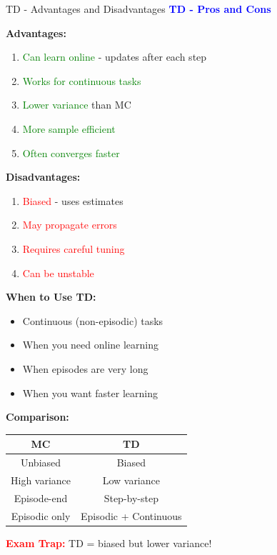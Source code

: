 \documentclass[8pt]{beamer}
\begin{document}
\begin{frame}{TD - Advantages and Disadvantages}
\fontsize{6.5}{7.5}\selectfont
\textcolor{blue}{\textbf{TD - Pros and Cons}}

\textbf{Advantages:}
\begin{enumerate}
\item \textcolor{green}{Can learn online} - updates after each step
\item \textcolor{green}{Works for continuous tasks}
\item \textcolor{green}{Lower variance} than MC
\item \textcolor{green}{More sample efficient}
\item \textcolor{green}{Often converges faster}
\end{enumerate}

\textbf{Disadvantages:}
\begin{enumerate}
\item \textcolor{red}{Biased} - uses estimates
\item \textcolor{red}{May propagate errors}
\item \textcolor{red}{Requires careful tuning}
\item \textcolor{red}{Can be unstable}
\end{enumerate}

\textbf{When to Use TD:}
\begin{itemize}
\item Continuous (non-episodic) tasks
\item When you need online learning
\item When episodes are very long
\item When you want faster learning
\end{itemize}

\textbf{Comparison:}
\begin{tabular}{|c|c|}
\hline
MC & TD \\
\hline
Unbiased & Biased \\
\hline
High variance & Low variance \\
\hline
Episode-end & Step-by-step \\
\hline
Episodic only & Episodic + Continuous \\
\hline
\end{tabular}

\textcolor{red}{\textbf{Exam Trap:}} TD = biased but lower variance!
\end{frame}
\end{document}
